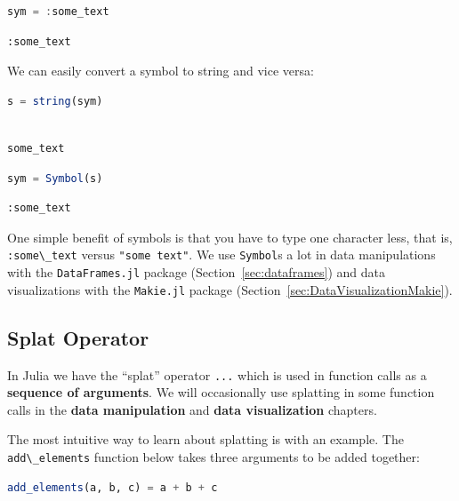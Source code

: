 \documentclass[
  notoc %
]{tufte-book}
\newcommand{\passthrough}[1]{#1}
\begin{document}
\begin{lstlisting}[language=Julia]
sym = :some_text
\end{lstlisting}

\begin{lstlisting}[language=Output]
:some_text
\end{lstlisting}

We can easily convert a symbol to string and vice versa:

\begin{lstlisting}[language=Julia]
s = string(sym)
\end{lstlisting}

\begin{lstlisting}[language=Output]

some_text

\end{lstlisting}

\begin{lstlisting}[language=Julia]
sym = Symbol(s)
\end{lstlisting}

\begin{lstlisting}[language=Output]
:some_text
\end{lstlisting}

One simple benefit of symbols is that you have to type one character
less, that is, \passthrough{\lstinline!:some\_text!} versus
\passthrough{\lstinline!"some text"!}. We use
\passthrough{\lstinline!Symbol!}s a lot in data manipulations with the
\passthrough{\lstinline!DataFrames.jl!} package
(Section~\ref{sec:dataframes}) and data visualizations with the
\passthrough{\lstinline!Makie.jl!} package
(Section~\ref{sec:DataVisualizationMakie}).

\hypertarget{sec:splat}{%
\subsection{Splat Operator}\label{sec:splat}}

In Julia we have the ``splat'' operator \passthrough{\lstinline!...!}
which is used in function calls as a \textbf{sequence of arguments}. We
will occasionally use splatting in some function calls in the
\textbf{data manipulation} and \textbf{data visualization} chapters.

The most intuitive way to learn about splatting is with an example. The
\passthrough{\lstinline!add\_elements!} function below takes three
arguments to be added together:

\begin{lstlisting}[language=Julia]
add_elements(a, b, c) = a + b + c
\end{lstlisting}
\end{document}
